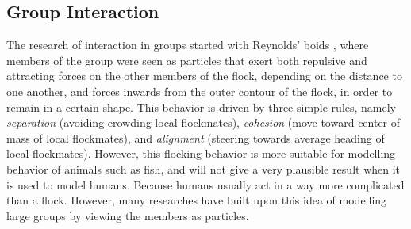 \documentclass[11pt]{book}
\begin{document}
\subsection{Group Interaction}
The research of interaction in groups started with Reynolds' boids \cite{Reynolds87flocks} , where members of the group were seen as particles that exert both repulsive and attracting forces on the other members of the flock, depending on the distance to one another, and forces inwards from the outer contour of the flock, in order to remain in a certain shape.  This behavior is driven by three simple rules, namely \emph{separation} (avoiding crowding local flockmates), \emph{cohesion} (move toward center of mass of local flockmates), and \emph{alignment} (steering towards average heading of local flockmates). However, this flocking behavior is more suitable for modelling behavior of animals such as fish, and will not give a very plausible result when it is used to model humans. Because humans usually act in a way more complicated than a flock. However, many researches have built upon this idea of modelling large groups by viewing the members as particles.
\end{document}
